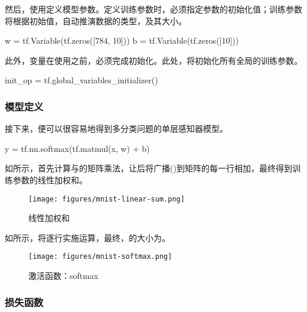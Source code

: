 \begin{content}
\begin{content}
然后，使用定义模型参数。定义训练参数时，必须指定参数的初始化值；训练参数将根据初始值，自动推演数据的类型，及其大小。

\begin{leftbar}
\begin{python}
w = tf.Variable(tf.zeros([784, 10]))
b = tf.Variable(tf.zeros([10]))
\end{python}
\end{leftbar}

此外，变量在使用之前，必须完成初始化。此处，将初始化所有全局的训练参数。

\begin{leftbar}
\begin{python}
init_op = tf.global_variables_initializer()
\end{python}
\end{leftbar}

\subsubsection{模型定义}

接下来，便可以很容易地得到多分类问题的单层感知器模型。

\begin{leftbar}
\begin{python}
y = tf.nn.softmax(tf.matmul(x, w) + b)
\end{python}
\end{leftbar}

如所示，首先计算与的矩阵乘法，让后将广播()到矩阵的每一行相加，最终得到训练参数的线性加权和。

\begin{figure}[H]
\centering
\texttt{[image: figures/mnist-linear-sum.png]}
\caption{线性加权和}
 \label{fig:mnist-linear-sum}
\end{figure}

如所示，将逐行实施运算，最终，的大小为\code{[100, 10]}。

\begin{figure}[H]
\centering
\texttt{[image: figures/mnist-softmax.png]}
\caption{激活函数：softmax}
 \label{fig:mnist-softmax}
\end{figure}

\subsubsection{损失函数}


\end{content}
\end{content}
